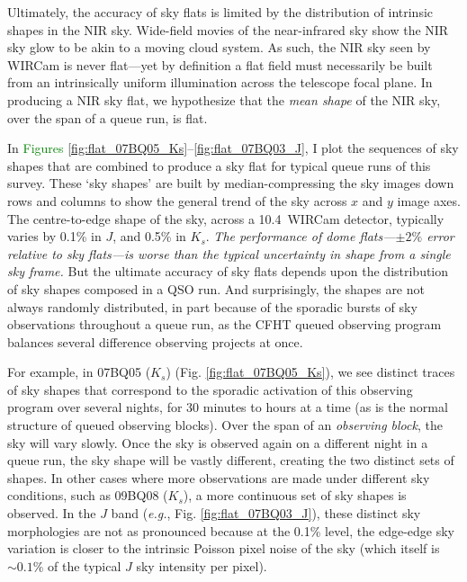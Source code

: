 \documentclass[iop]{emulateapj}
\newcommand{\eg}{\textit{e.g.}}
\newcommand{\todo}[1]{\textcolor{green}{#1}} %
\begin{document}
Ultimately, the accuracy of sky flats is limited by the distribution of intrinsic shapes in the NIR sky. Wide-field movies of the near-infrared sky \citep{Adams:1996} show the NIR sky glow to be akin to a moving cloud system. As such, the NIR sky seen by WIRCam is never flat---yet by definition a flat field must necessarily be built from an intrinsically uniform illumination across the telescope focal plane. In producing a NIR sky flat, we hypothesize that the \emph{mean shape} of the NIR sky, over the span of a queue run, is flat.

In \todo{Figures} \ref{fig:flat_07BQ05_Ks}--\ref{fig:flat_07BQ03_J}, I plot the sequences of sky shapes that are combined to produce a sky flat for typical queue runs of this survey. These `sky shapes' are built by median-compressing the sky images down rows and columns to show the general trend of the sky across $x$ and $y$ image axes. The centre-to-edge shape of the sky, across a 10.4\arcmin\ WIRCam detector, typically varies by 0.1\% in $J$, and 0.5\% in $K_s$. \emph{The performance of dome flats---$\pm2\%$ error relative to sky flats---is worse than the typical uncertainty in shape from a single sky frame.} But the ultimate accuracy of sky flats depends upon the distribution of sky shapes composed in a QSO run. And surprisingly, the shapes are not always randomly distributed, in part because of the sporadic bursts of sky observations throughout a queue run, as the CFHT queued observing program balances several difference observing projects at once.

For example, in 07BQ05 ($K_s$) (Fig. \ref{fig:flat_07BQ05_Ks}), we see distinct traces of sky shapes that correspond to the sporadic activation of this observing program over several nights, for 30 minutes to hours at a time (as is the normal structure of queued observing blocks). Over the span of an \emph{observing block}, the sky will vary slowly. Once the sky is observed again on a different night in a queue run, the sky shape will be vastly different, creating the two distinct sets of shapes. In other cases where more observations are made under different sky conditions, such as 09BQ08 ($K_s$), a more continuous set of sky shapes is observed. In the $J$ band (\eg, Fig. \ref{fig:flat_07BQ03_J}), these distinct sky morphologies are not as pronounced because at the 0.1\% level, the edge-edge sky variation is closer to the intrinsic Poisson pixel noise of the sky (which itself is $\sim 0.1\%$ of the typical $J$ sky intensity per pixel).
\end{document}
